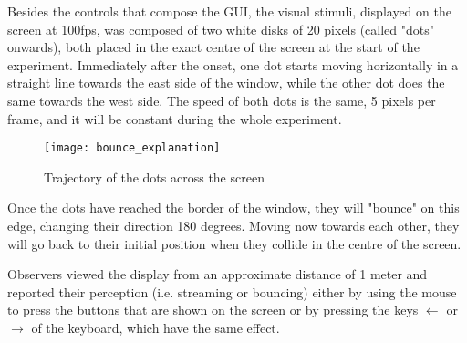 Besides the controls that compose the GUI, the visual stimuli, displayed on the screen at 100fps, was composed of two white disks of 20 pixels (called "dots" onwards), both placed in the exact centre of the screen at the start of the experiment. Immediately after the onset, one dot starts moving horizontally in a straight line towards the east side of the window, while the other dot does the same towards the west side. The speed of both dots is the same, 5 pixels per frame, and it will be constant during the whole experiment. 

\begin{figure}[!ht]
		\centering
		\vspace{0.5cm}
		\texttt{[image: bounce\_explanation]}
		\caption{Trajectory of the dots across the screen}
\end{figure} 

 Once the dots have reached the border of the window, they will "bounce" on this edge, changing their direction 180 degrees. Moving now towards each other, they will go back to their initial position when they collide in the centre of the screen.

Observers viewed the display from an approximate distance of 1 meter and reported their perception (i.e. streaming or bouncing) either by using the mouse to press the buttons that are shown on the screen or by pressing the keys $\leftarrow$ or $\rightarrow$ of the keyboard, which have the same effect. 



